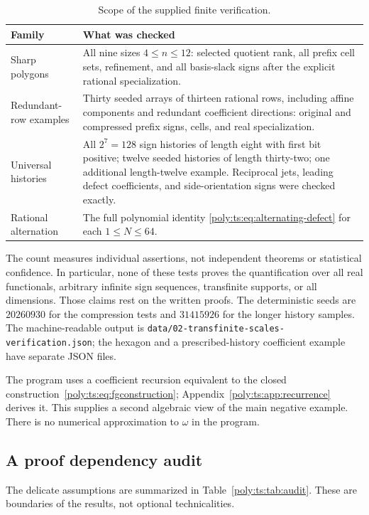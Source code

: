 \documentclass[11pt,a4paper]{article}
\numberwithin{equation}{section}
\theoremstyle{plain}
\begin{document}
\begin{table}[htbp]
\centering
\caption{Scope of the supplied finite verification.}\label{poly:ts:tab:verification}
\begin{tabular}{@{}p{}p{}@{}}
\toprule
Family & What was checked\\
\midrule
Sharp polygons & All nine sizes $4\le n\le12$: selected quotient rank,
all prefix cell sets, refinement, and all basis-slack signs after the
explicit rational specialization.\\[3pt]
Redundant-row examples & Thirty seeded arrays of thirteen rational rows,
including affine components and redundant coefficient directions:
original and compressed prefix signs, cells, and real specialization.\\[3pt]
Universal histories & All $2^7=128$ sign histories of length eight with
first bit positive; twelve seeded histories of length thirty-two; one
additional length-twelve example. Reciprocal jets, leading defect
coefficients, and side-orientation signs were checked exactly.\\[3pt]
Rational alternation & The full polynomial identity
\eqref{poly:ts:eq:alternating-defect} for each $1\le N\le64$.\\
\bottomrule
\end{tabular}
\end{table}

The count measures individual assertions, not independent theorems or
statistical confidence. In particular, none of these tests proves the
quantification over all real functionals, arbitrary infinite sign
sequences, transfinite supports, or all dimensions. Those claims rest on
the written proofs. The deterministic seeds are $20260930$ for the
compression tests and $31415926$ for the longer history samples.
The machine-readable output is \nolinkurl{data/02-transfinite-scales-verification.json}; the
hexagon and a prescribed-history coefficient example have separate JSON
files.

The program uses a coefficient recursion equivalent to the closed
construction~\eqref{poly:ts:eq:fgconstruction}; Appendix~\ref{poly:ts:app:recurrence}
derives it. This supplies a second algebraic view of the main negative
example. There is no numerical approximation to $\omega$ in the program.

\subsection{A proof dependency audit}\label{poly:ts:sec:audit}
The delicate assumptions are summarized in Table~\ref{poly:ts:tab:audit}.
These are boundaries of the results, not optional technicalities.
\end{document}
